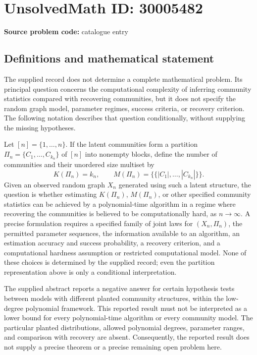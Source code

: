 \documentclass[11pt]{article}
\begin{document}
\section*{UnsolvedMath ID: 30005482}
\textbf{Source problem code:} catalogue entry
\subsection{Definitions and mathematical statement}
The supplied record does not determine a complete mathematical problem. Its principal question concerns the computational complexity of inferring community statistics compared with recovering communities, but it does not specify the random graph model, parameter regimes, success criteria, or recovery criterion. The following notation describes that question conditionally, without supplying the missing hypotheses.

Let \([n]=\{1,\ldots,n\}\). If the latent communities form a partition \(\Pi_n=\{C_1,\ldots,C_{k_n}\}\) of \([n]\) into nonempty blocks, define the number of communities and their unordered size multiset by
\[
K(\Pi_n)=k_n,\qquad
M(\Pi_n)=\{\!\{|C_1|,\ldots,|C_{k_n}|\}\!\}.
\]
Given an observed random graph \(X_n\) generated using such a latent structure, the question is whether estimating \(K(\Pi_n)\), \(M(\Pi_n)\), or other specified community statistics can be achieved by a polynomial-time algorithm in a regime where recovering the communities is believed to be computationally hard, as \(n\to\infty\). A precise formulation requires a specified family of joint laws for \((X_n,\Pi_n)\), the permitted parameter sequences, the information available to an algorithm, an estimation accuracy and success probability, a recovery criterion, and a computational hardness assumption or restricted computational model. None of these choices is determined by the supplied record; even the partition representation above is only a conditional interpretation.

The supplied abstract reports a negative answer for certain hypothesis tests between models with different planted community structures, within the low-degree polynomial framework. This reported result must not be interpreted as a lower bound for every polynomial-time algorithm or every community model. The particular planted distributions, allowed polynomial degrees, parameter ranges, and comparison with recovery are absent. Consequently, the reported result does not supply a precise theorem or a precise remaining open problem here.
\end{document}
